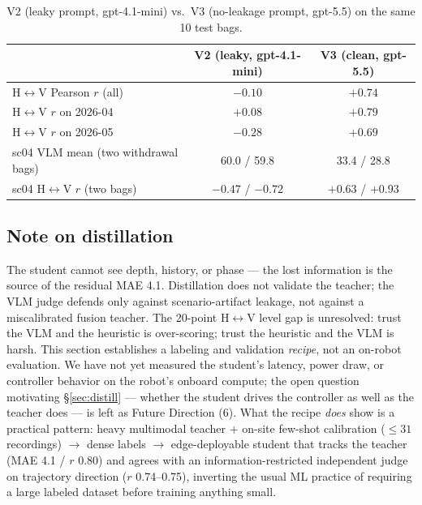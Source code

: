 \documentclass{article}
\begin{document}
\begin{table}[h]
\centering
\caption{V2 (leaky prompt, gpt-4.1-mini) vs.\ V3 (no-leakage prompt, gpt-5.5) on the same 10 test bags.}
\label{tab:v2v3}
\small
\begin{tabular}{@{}lcc@{}}
\toprule
 & V2 (leaky, gpt-4.1-mini) & V3 (clean, gpt-5.5) \\
\midrule
H$\leftrightarrow$V Pearson $r$ (all)           & $-0.10$ & $\mathbf{+0.74}$ \\
H$\leftrightarrow$V $r$ on 2026-04              & $+0.08$ & $+0.79$ \\
H$\leftrightarrow$V $r$ on 2026-05              & $-0.28$ & $+0.69$ \\
sc04 VLM mean (two withdrawal bags)             & 60.0 / 59.8 & 33.4 / 28.8 \\
sc04 H$\leftrightarrow$V $r$ (two bags)         & $-0.47$ / $-0.72$ & $+0.63$ / $+0.93$ \\
\bottomrule
\end{tabular}
\end{table}

\subsection{Note on distillation}

The student cannot see depth, history, or phase --- the lost information is the source of the residual MAE 4.1. Distillation does not validate the teacher; the VLM judge defends only against scenario-artifact leakage, not against a miscalibrated fusion teacher. The 20-point H$\leftrightarrow$V level gap is unresolved: trust the VLM and the heuristic is over-scoring; trust the heuristic and the VLM is harsh. This section establishes a labeling and validation \emph{recipe}, not an on-robot evaluation. We have not yet measured the student's latency, power draw, or controller behavior on the robot's onboard compute; the open question motivating \S\ref{sec:distill} --- whether the student drives the controller as well as the teacher does --- is left as Future Direction (6). What the recipe \emph{does} show is a practical pattern: heavy multimodal teacher + on-site few-shot calibration ($\le 31$ recordings) $\to$ dense labels $\to$ edge-deployable student that tracks the teacher (MAE 4.1 / $r$ 0.80) and agrees with an information-restricted independent judge on trajectory direction ($r$ 0.74--0.75), inverting the usual ML practice of requiring a large labeled dataset before training anything small.
\end{document}
